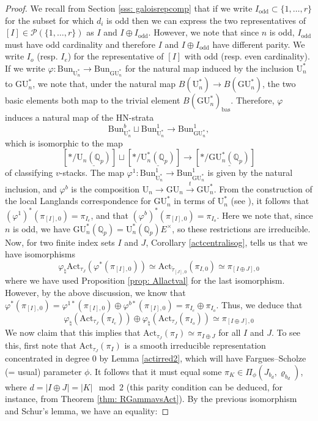 \documentclass[reqno,11pt]{amsart}
\theoremstyle{remark}
\newcommand{\GU}{\mathrm{GU}}
\newcommand{\U}{\mathrm{U}}
\newcommand{\mc}{\mathcal}
\newcommand{\Q}{\mathbb{Q}}
\newcommand{\bas}{\mathrm{bas}}
\newcommand{\Act}{\mathrm{Act}}
\newcommand{\Bun}{\mathrm{Bun}}
\newcommand{\ttau}{\tilde{\tau}}
\def\ra{\rightarrow}
\begin{document}
\begin{proof}
We recall from Section \ref{sss: galoisrepcomp} that if we write $I_{\mathrm{odd}} \subset \{1, \dots, r\}$ for the subset for which $d_{i}$ is odd then we can express the two representatives of $[I] \in \mc{P}(\{1,\ldots,r\})$ as $I$ and $I \oplus I_{\mathrm{odd}}$. However, we note that since $n$ is odd, $I_{\mathrm{odd}}$ must have odd cardinality and therefore $I$ and $I \oplus I_{\mathrm{odd}}$ have different parity. We write $I_{o}$ (resp. $I_{e}$) for the representative of $[I]$ with odd (resp. even cardinality). If we write $\varphi: \Bun_{\mathrm{U}^*_{n}} \ra \Bun_{\GU^*_{n}}$ for the natural map induced by the inclusion $\U^*_{n}$ to $\GU^*_{n}$, we note that, under the natural map $B(\U^*_{n}) \ra B(\GU^*_{n})$, the two basic elements both map to the trivial element $B(\GU^*_{n})_{\bas}$. Therefore, $\varphi$ induces a natural map of the HN-strata
\[ \Bun_{\U^*_{n}}^{b} \sqcup \Bun_{\U^*_{n}}^{1}  \ra  \Bun_{\GU^*_{n}}^{1}, \]
which is isomorphic to the map 
\[ [\ast/\underline{\U_{n}(\mathbb{Q}_{p})}] \sqcup  [\ast/\underline{\U^*_{n}(\mathbb{Q}_{p})}] \ra [\ast/\underline{\GU^*_{n}(\mathbb{Q}_{p})}] \]
of classifying $v$-stacks. The map $\varphi^{1}: \Bun_{\U^*_{n}}^{1}  \ra \Bun_{\GU^*_{n}}^{1}$ is given by the natural inclusion, and $\varphi^{b}$ is the composition $\U_n \rightarrow \GU_n \xrightarrow{t} \GU^*_n$. From the construction of the local Langlands correspondence for $\GU^*_n$ in terms of $\U^*_n$ (see \cite{BMN}), it follows that $(\varphi^{1})^{*}(\pi_{[I],0}) = \pi_{I_{e}}$, and that $(\varphi^{b})^{*}(\pi_{[I],0}) = \pi_{I_{o}}$. Here we note that, since $n$ is odd, we have $\GU^*_n(\Q_p) = \U^*_n(\Q_p) E^{\times}$, so these restrictions are irreducible. Now, for two finite index sets $I$ and $J$, Corollary \ref{actcentralisog}, tells us that we have isomorphisms
\[ \varphi_{\natural}\Act_{\tau_{J}}(\varphi^{*}(\pi_{[I],0})) \simeq \Act_{\ttau_{[J],0}}(\pi_{I,0}) \simeq \pi_{[I \oplus J],0} \]
where we have used Proposition \ref{prop: Allactval} for the last isomorphism. However, by the above discussion, we know that $\varphi^{*}(\pi_{[I],0}) = \varphi^{1*}(\pi_{[I],0}) \oplus \varphi^{b*}(\pi_{[I],0}) = \pi_{I_{e}} \oplus \pi_{I_{o}}$. Thus, we deduce that
\[ \varphi_{\natural}(\Act_{\tau_{J}}(\pi_{I_{e}})) \oplus \varphi_{\natural}(\Act_{\tau_{J}}(\pi_{I_{o}})) \simeq \pi_{[I \oplus J],0} \]
We now claim that this implies that $\Act_{\tau_{J}}(\pi_{I}) \simeq \pi_{I \oplus J}$ for all $I$ and $J$. To see this, first note that $\Act_{\tau_{J}}(\pi_{I})$ is a smooth irreducible representation concentrated in degree $0$ by Lemma \ref{actirred2}, which will have Fargues--Scholze (= usual) parameter $\phi$. It follows that it must equal some $\pi_{K} \in \Pi_{\phi}(J_{b_{d}}, \varrho_{b_d})$, where $d = |I \oplus J| = |K| \mod 2$ (this parity condition can be deduced, for instance, from Theorem \ref{thm: RGammavsAct}). By the previous isomorphism and Schur's lemma, we have an equality:

\end{proof}
\end{document}
